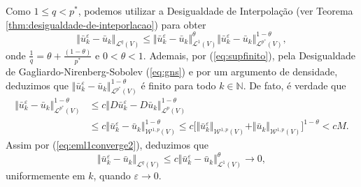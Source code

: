 \documentclass[a4paper, 11pt]{book}
\theoremstyle{definition}
\newcommand{\bN}{\mathbb{N}}
\newcommand{\cL}{\mathcal{L}}
\newcommand{\cW}{\mathcal{W}}
\begin{document}
\begin{prf}
    Como $1 \leqslant q < p^*$, podemos utilizar a Desigualdade de Interpolação (ver Teorema \ref{thm:desigualdade-de-inteporlacao}) para obter
    \[
        \Vert \bar u_k^\varepsilon - \bar u_k \Vert_{\cL^q(V)} \leqslant \Vert \bar u_k^\varepsilon - \bar u_k \Vert_{\cL^1(V)}^\theta \Vert \bar u_k^\varepsilon - \bar u_k \Vert_{\cL^{p^*}(V)}^{1- \theta},
    \]
    onde $\frac{1}{q} = \theta + \frac{(1 - \theta)}{p^*}$ e $0 < \theta < 1$.
    Ademais, por (\ref{eq:supfinito}), pela Desigualdade de Gagliardo-Nirenberg-Sobolev (\ref{eq:gns}) e por um argumento de densidade, deduzimos que $\Vert \bar u_k^\varepsilon - \bar u_k \Vert_{\cL^{p^*}(V)}^{1- \theta}$ é finito para todo $k \in\bN$. De fato, é verdade que
    \begin{equation} \label{eq:idk}
        \begin{aligned}
            \Vert \bar u_k^\varepsilon - \bar u_k \Vert_{\cL^{p^*}(V)}^{1 - \theta} &\leqslant c \Vert D\bar u_k^\varepsilon - D\bar u_k \Vert_{\cL^p(V)}^{1 - \theta}\\ 
            &\leqslant c \Vert \bar u_k^\varepsilon - \bar u_k \Vert_{\cW^{1,p}(V)}^{1- \theta} \leqslant c \big[\Vert \bar u_k^\varepsilon \Vert_{\cW^{1,p}(V)} + \Vert \bar u_k \Vert_{\cW^{1,p}(V)} \big]^{1-\theta} < cM.
        \end{aligned}
    \end{equation}
    Assim por (\ref{eq:eml1converge2}), deduzimos que
    \[
        \Vert \bar u_k^\varepsilon - \bar u_k \Vert_{\cL^q(V)} \leqslant c \Vert \bar u_k^\varepsilon - \bar u_k \Vert_{\cL^1(V)}^\theta \to 0,
    \]
    uniformemente em $k$, quando $\varepsilon \to 0$.


\end{prf}
\end{document}
